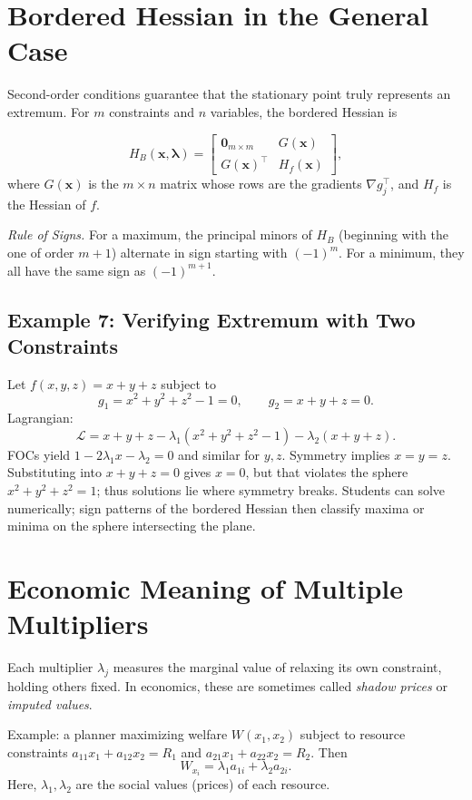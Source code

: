 \documentclass[12pt]{article}
\newcommand{\grad}{\nabla}
\newcommand{\ve}[1]{\boldsymbol{#1}}
\newcommand{\Lag}{\mathcal{L}}
\begin{document}
\section*{Bordered Hessian in the General Case}

Second-order conditions guarantee that the stationary point truly represents an extremum.  
For \(m\) constraints and \(n\) variables, the bordered Hessian is

\[
H_B(\ve{x},\ve{\lambda}) =
\begin{bmatrix}
\ve{0}_{m\times m} & G(\ve{x})\\
G(\ve{x})^{\!\top} & H_f(\ve{x})
\end{bmatrix},
\]
where \(G(\ve{x})\) is the \(m\times n\) matrix whose rows are the gradients \(\grad g_j^\top\), and \(H_f\) is the Hessian of \(f\).

\textit{Rule of Signs.}
For a maximum, the principal minors of \(H_B\) (beginning with the one of order \(m+1\)) alternate in sign starting with \((-1)^m\).  
For a minimum, they all have the same sign as \((-1)^{m+1}\).

\subsection*{Example 7: Verifying Extremum with Two Constraints}

Let \(f(x,y,z)=x+y+z\) subject to
\[
g_1=x^2+y^2+z^2-1=0, \qquad g_2=x+y+z=0.
\]
Lagrangian:
\[
\Lag = x+y+z-\lambda_1(x^2+y^2+z^2-1)-\lambda_2(x+y+z).
\]
FOCs yield \(1-2\lambda_1x-\lambda_2=0\) and similar for \(y,z\).  
Symmetry implies \(x=y=z\). Substituting into \(x+y+z=0\) gives \(x=0\), but that violates the sphere \(x^2+y^2+z^2=1\); thus solutions lie where symmetry breaks.  
Students can solve numerically; sign patterns of the bordered Hessian then classify maxima or minima on the sphere intersecting the plane.

\section*{Economic Meaning of Multiple Multipliers}

Each multiplier \(\lambda_j\) measures the marginal value of relaxing its own constraint, holding others fixed.  
In economics, these are sometimes called \textit{shadow prices} or \textit{imputed values}.  

Example: a planner maximizing welfare \(W(x_1,x_2)\) subject to resource constraints  
\(a_{11}x_1+a_{12}x_2=R_1\) and \(a_{21}x_1+a_{22}x_2=R_2\).  
Then  
\[
W_{x_i} = \lambda_1 a_{1i} + \lambda_2 a_{2i}.
\]
Here, \(\lambda_1,\lambda_2\) are the social values (prices) of each resource.
\end{document}
